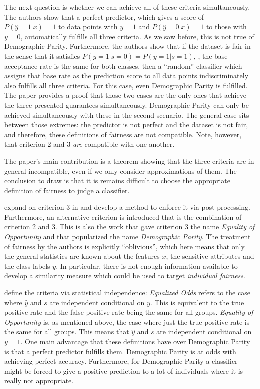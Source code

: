 The next question is whether we can achieve all of these criteria simultaneously.
The authors show that a perfect predictor,
which gives a score of \(P(\hat{y}=1|x) = 1\) to data points with \(y=1\)
and \(P(\hat{y}=0|x) = 1\) to those with \(y=0\),
automatically fulfills all three criteria.
As we saw before, this is not true of Demographic Parity.
Furthermore, the authors show that if the dataset is fair in the sense that it satisfies \(P(y=1|s=0) = P(y=1|s=1)\),
\ie, the base acceptance rate is the same for both classes,
then a ``random'' classifier which assigns that base rate as the prediction score to all data points indiscriminately
also fulfills all three criteria.
For this case, even Demographic Parity is fulfilled.
The paper provides a proof
that those two cases are the only ones that achieve the three presented guarantees simultaneously.
Demographic Parity can only be achieved simultaneously with these in the second scenario.
The general case sits between those extremes:
the predictor is not perfect and the dataset is not fair,
and therefore, these definitions of fairness are not compatible.
Note, however, that criterion 2 and 3 \emph{are} compatible with one another.

The paper's main contribution is a theorem showing that the three criteria are in general incompatible,
even if we only consider approximations of them.
The conclusion to draw is
that it is remains difficult to choose the appropriate definition of fairness to judge a classifier.

\citet{hardt2016equality} expand on criterion 3 in \citet{kleinberg2016inherent}
and develop a method to enforce it via post-processing.
Furthermore, an alternative criterion is introduced that is the combination of criterion 2 and 3.
This is also the work that gave criterion 3 the name \emph{Equality of Opportunity}
and that popularized the name \emph{Demographic Parity}.
The treatment of fairness by the authors is explicitly ``oblivious'',
which here means that only the general statistics are known
about the features \(x\), the sensitive attributes and the class labels \(y\).
In particular, there is not enough information available to develop a similarity measure
which could be used to target \emph{individual fairness}.

\citet{hardt2016equality} define the criteria via statistical independence:
\emph{Equalized Odds} refers to the case where \(\hat{y}\) and \(s\) are independent conditional on \(y\).
This is equivalent to the true positive rate and the false positive rate being the same for all groups.
\emph{Equality of Opportunity} is, as mentioned above,
the case where just the true positive rate is the same for all groups.
This means that \(\hat{y}\) and \(s\) are independent conditional on \(y=1\).
One main advantage that these definitions have over Demographic Parity is that a perfect predictor fulfills them.
Demographic Parity is at odds with achieving perfect accuracy.
Furthermore, for Demographic Parity a classifier might be forced to give a positive prediction to a lot of individuals
where it is really not appropriate.

